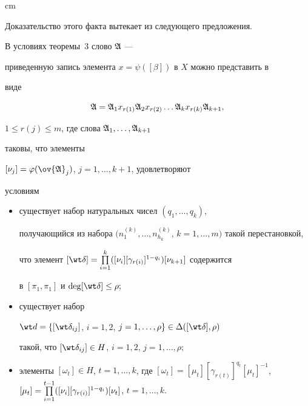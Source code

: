  cm





Доказательство этого факта вытекает из следующего предложения.





\begin{propnonum}


В условиях теоремы~$3$ слово $\frak A$ ---


приведенную запись элемента $x=\psi([\beta])$ в $X$ можно представить в


виде


\begin{equation}


\frak A=\frak A_1 x_{r(1)}\frak A_2 x_{r(2)}\dotsc


\frak A_k x_{r(k)}\frak A_{k+1},


\label{101}


\end{equation}


$1\le r(j)\le m$, где слова $\frak A_1,\dotsc,\frak A_{k+1}$


таковы, что элементы


$[\nu_j]=\varphi(\ov{\frak A}_j)$, $j=1,\dotsc,k+1$, удовлетворяют


условиям


\begin{itemize}


\item[I)] существует набор натуральных чисел $(q_1,\dotsc,q_k)$, 


получающийся из набора $(n^{(k)}_1,\dotsc,


n^{(k)}_{h_k}$, $k=1,\dotsc,m)$ такой перестановкой,


что элемент $[\wt\delta]=\PL_{i=1}^k


([\nu_i][\gamma_{r(i)}]^{1-q_i})[\nu_{k+1}]$ содержится


в $[\pi_1,\pi_1]$ и $\deg[\wt\delta]\le\rho;$


\item[II)] существует набор


$\wt d=\{[\wt\delta_{ij}]$, $i=1,2$, $j=1,\dotsc,\rho\}\in\Delta


([\wt\delta],\rho)$


такой, что $[\wt\delta_{ij}]\in H$, $i=1,2$, $j=1,\dotsc,\rho;$


\item[III)] элементы $[\omega_t]\in H$, $t=1,\dotsc,k$, где $[\omega_t]=[\mu_t][\gamma_{r(t)}]^{q_t}


[\mu_t]^{-1}$, $[\mu_t]=\PL_{i=1}^{t-1}


([\nu_i][\gamma_{r(i)}]^{1-q_i})[\nu_t]$, $t=1,\dotsc,k$.


\end{itemize}


\end{propnonum}





